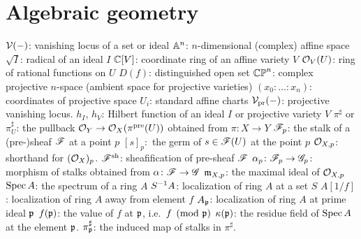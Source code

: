 \section{Algebraic geometry}
\begin{itemize}
	\ii $\mathcal V(-)$: vanishing locus of a set or ideal
	\ii $\mathbb A^n$: $n$-dimensional (complex) affine space
	\ii $\sqrt I$: radical of an ideal $I$
	\ii $\mathbb C[V]$: coordinate ring of an affine variety $V$
	\ii $\mathcal O_V(U)$: ring of rational functions on $U$
	\ii $D(f)$: distinguished open set
	\ii $\mathbb{CP}^n$: complex projective $n$-space (ambient space for projective varieties)
	\ii $(x_0 : \dots : x_n)$: coordinates of projective space
	\ii $U_i$: standard affine charts
	\ii $\mathcal V_{\text{pr}}(-)$: projective vanishing locus.
	\ii $h_I$, $h_V$: Hilbert function of an ideal $I$ or projective variety $V$
	\ii $\pi^\sharp$ or $\pi^\sharp_U$: the pullback $\mathcal O_Y \to \mathcal O_X(\pi^{\text{pre}}(U))$ obtained from $\pi \colon X \to Y$
	\ii $\mathscr F_p$: the stalk of a (pre-)sheaf $\mathscr F$ at a point $p$
	\ii $[s]_p:$ the germ of $s \in \mathscr F(U)$ at the point $p$
	\ii $\mathcal O_{X,p}$: shorthand for $(\mathcal O_X)_p$.
	\ii $\mathscr F^\mathrm{sh}$: sheafification of pre-sheaf $\mathscr F$
	\ii $\alpha_p \colon \mathscr F_p \to \mathscr G_p$: morphism of stalks obtained from $\alpha \colon \mathscr F \to \mathscr G$
	\ii $\mathfrak m_{X,p}$: the maximal ideal of $\mathcal O_{X,p}$
	\ii $\operatorname{Spec} A$: the spectrum of a ring $A$
	\ii $S^{-1} A$: localization of ring $A$ at a set $S$
	\ii $A[1/f]$: localization of ring $A$ away from element $f$
	\ii $A_\mathfrak p$: localization of ring $A$ at prime ideal $\mathfrak p$
	\ii $f(\mathfrak p)$: the value of $f$ at $\mathfrak p$, i.e.\ $f \pmod {\mathfrak p}$
	\ii $\kappa(\mathfrak p)$: the residue field of $\operatorname{Spec} A$ at the element $\mathfrak p$.
	\ii $\pi^\sharp_{\mathfrak p}$: the induced map of stalks in $\pi^\sharp$.
\end{itemize}

